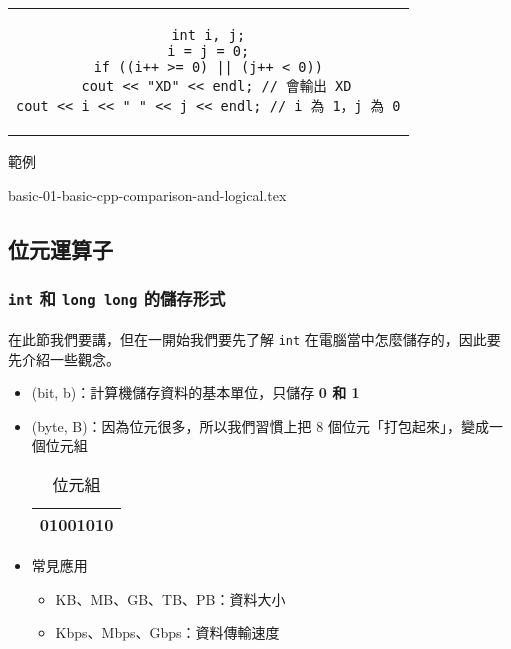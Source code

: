 \documentclass[12pt,a4paper,oneside]{article}
\begin{document}
\begin{CJK}{UTF8}{bkai}
\begin{itemize}
\begin{code}[h!]
\centering
\begin{tabular}{c}
\begin{lstlisting}
int i, j;
i = j = 0;
if ((i++ >= 0) || (j++ < 0))
  cout << "XD" << endl; // 會輸出 XD
cout << i << " " << j << endl; // i 為 1，j 為 0
\end{lstlisting}
\end{tabular}
\caption{範例}
\label{basic:cpp:code:short:cut:2}
\end{code}

\end{itemize}

\label{basic:cpp:problem:comparison}
{basic-01-basic-cpp-comparison-and-logical.tex}

\subsection{位元運算子}
\subsubsection{\lstinline!int! 和 \lstinline!long long! 的儲存形式}

\paragraph{}在此節我們要講，但在一開始我們要先了解 \lstinline!int! 在電腦當中怎麼儲存的，因此要先介紹一些觀念。

\begin{itemize}
\item {} (bit, b)：計算機儲存資料的基本單位，只儲存 \textbf{0 和 1}
\item {} (byte, B)：因為位元很多，所以我們習慣上把 8 個位元「打包起來」，變成一個位元組

\begin{table}[h]
\centering
\begin{tabular}{|c|}
\hline
01001010\\
\hline
\end{tabular}
\caption{位元組}
\label{basic:cpp:table:byte}
\end{table}

\item 常見應用
  \begin{itemize}
  \item KB、MB、GB、TB、PB：資料大小
  \item Kbps、Mbps、Gbps：資料傳輸速度
  \end{itemize}
\end{itemize}


\end{CJK}
\end{document}
